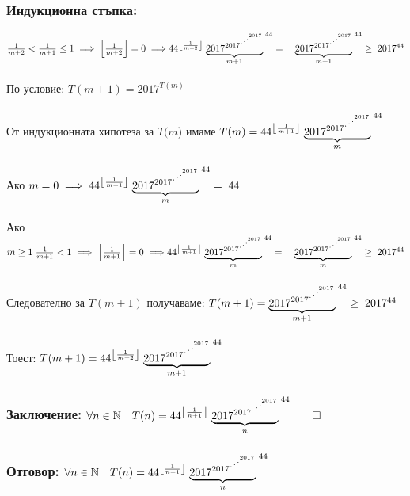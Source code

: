 \documentclass[14pt]{extarticle}
\newcommand{\N}{\mathbb{N}}
\begin{document}
\subsubsection*{Индукционна стъпка:}
\(\frac{1}{m + 2} < \frac{1}{m + 1} \leq 1 \implies \left\lfloor \frac{1}{m + 2} \right\rfloor = 0 \implies \\\\
44^{\left\lfloor \frac{1}{m + 2} \right\rfloor}\;{\underbrace{2017^{2017^{\Large{\iddots}^{2017}}}}_{m + 1}}^{\;44} = \quad {\underbrace{2017^{2017^{\Large{\iddots}^{2017}}}}_{m + 1}}^{\;44} \geq \; 2017^{44}\) \\\\
По условие: \(T(m + 1) = 2017^{T(m)}\) \\\\
От индукционната хипотеза за \(T(m\)) имаме \(T(m) = 44^{\left\lfloor \frac{1}{m + 1} \right\rfloor}\;{\underbrace{2017^{2017^{\Large{\iddots}^{2017}}}}_m}^{\;44}\) \\\\
Ако \(m = 0 \implies 44^{\left\lfloor \frac{1}{m + 1} \right\rfloor}\;{\underbrace{2017^{2017^{\Large{\iddots}^{2017}}}}_m}^{\;44} = \; 44 \) \\\\
Ако \(m \geq 1 \; \frac{1}{m + 1} < 1 \implies \left\lfloor \frac{1}{m + 1} \right\rfloor = 0 \implies \\\\
44^{\left\lfloor \frac{1}{m + 1} \right\rfloor}\;{\underbrace{2017^{2017^{\Large{\iddots}^{2017}}}}_m}^{\;44} = \quad {\underbrace{2017^{2017^{\Large{\iddots}^{2017}}}}_m}^{\;44} \geq \; 2017^{44} \) \\\\
Следователно за \(T(m + 1)\) получаваме: \(T(m + 1) = {\underbrace{2017^{2017^{\Large{\iddots}^{2017}}}}_{m + 1}}^{\;44} \geq \; 2017^{44}\) \\\\
Тоест: \(T(m + 1) = 44^{\left\lfloor \frac{1}{m + 2} \right\rfloor}\;{\underbrace{2017^{2017^{\Large{\iddots}^{2017}}}}_{m + 1}}^{\;44}\)
\subsubsection*{Заключение: \(\forall n \in \N \quad T(n) = 44^{\left\lfloor \frac{1}{n + 1} \right\rfloor}\;{\underbrace{2017^{2017^{\Large{\iddots}^{2017}}}}_n}^{\;44} \qed \)}
\subsubsection*{Отговор: \(\forall n \in \N \quad T(n) = 44^{\left\lfloor \frac{1}{n + 1} \right\rfloor}\;{\underbrace{2017^{2017^{\Large{\iddots}^{2017}}}}_n}^{\;44}\)}
\end{document}

